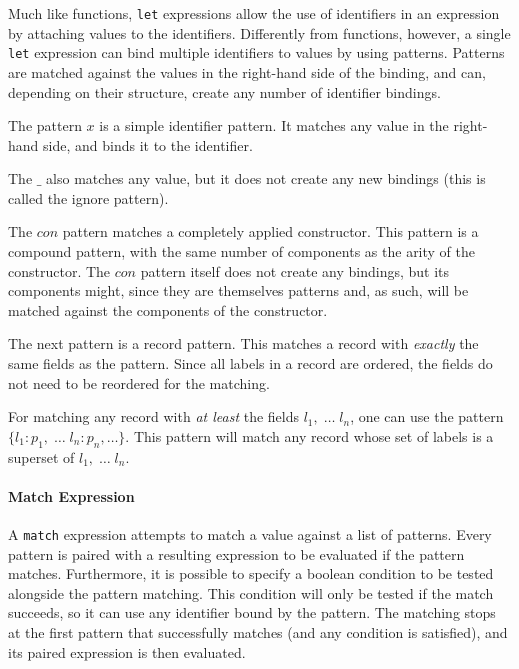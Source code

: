 \documentclass{article}
\begin{document}
\bigskip

Much like functions, \texttt{let} expressions allow the use of identifiers in an expression by attaching values to the identifiers.
Differently from functions, however, a single \texttt{let} expression can bind multiple identifiers to values by using patterns.
Patterns are matched against the values in the right-hand side of the binding, and can, depending on their structure, create any number of identifier bindings.

The pattern $x$ is a simple identifier pattern.
It matches any value in the right-hand side, and binds it to the identifier.

The $\_$ also matches any value, but it does not create any new bindings (this is called the ignore pattern).

The $con$ pattern matches a completely applied constructor.
This pattern is a compound pattern, with the same number of components as the arity of the constructor.
The $con$ pattern itself does not create any bindings, but its components might, since they are themselves patterns and, as such, will be matched against the components of the constructor.

The next pattern is a record pattern.
This matches a record with \emph{exactly} the same fields as the pattern.
Since all labels in a record are ordered, the fields do not need to be reordered for the matching.

For matching any record with \emph{at least} the fields $l_1, \; \dots \; l_n$, one can use the pattern $\{l_1: p_1, \; \dots \; l_n: p_n, \dots\}$.
This pattern will match any record whose set of labels is a superset of $l_1, \; \dots \; l_n$.

\paragraph{Match Expression}

A \texttt{match} expression attempts to match a value against a list of patterns.
Every pattern is paired with a resulting expression to be evaluated if the pattern matches.
Furthermore, it is possible to specify a boolean condition to be tested alongside the pattern matching.
This condition will only be tested if the match succeeds, so it can use any identifier bound by the pattern.
The matching stops at the first pattern that successfully matches (and any condition is satisfied), and its paired expression is then evaluated.

\medskip
\end{document}

